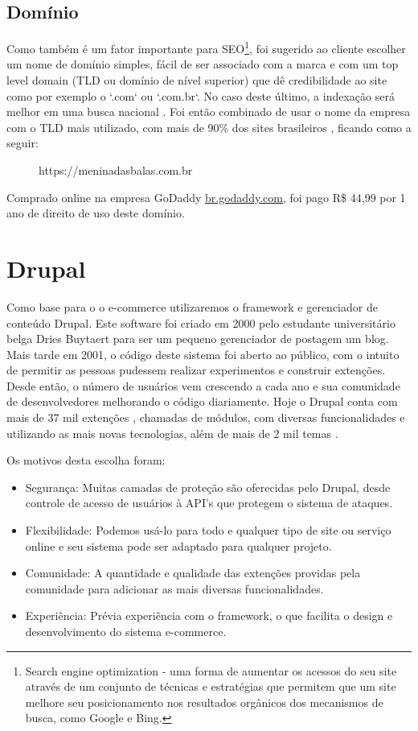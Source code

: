 \subsection{Domínio}
Como também é um fator importante para SEO\footnote{Search engine optimization - uma forma de aumentar os acessos do seu site através de um conjunto de técnicas e estratégias que permitem que um site melhore seu posicionamento nos resultados orgânicos dos mecanismos de busca, como Google e Bing\cite{SEO}.}, foi sugerido ao cliente escolher um nome de domínio simples, fácil de ser associado com a marca e com um top level domain (TLD ou domínio de nível superior) que dê credibilidade ao site como por exemplo o `.com` ou `.com.br`. No caso deste último, a indexação será melhor em uma busca nacional \cite{TLD}. Foi então combinado de usar o nome da empresa com o TLD mais utilizado, com mais de 90\% dos sites brasileiros \cite{RegistroBr}, ficando como a seguir:

\begin{figure}
  \centering
    \large
    https://meninadasbalas.com.br
\end{figure}

Comprado online na empresa GoDaddy \url{br.godaddy.com}, foi pago R\$ 44,99 por 1 ano de direito de uso deste domínio.

\section{Drupal}

Como base para o o e-commerce utilizaremos o framework e gerenciador de conteúdo Drupal. Este software foi criado em 2000 pelo estudante universitário belga Dries Buytaert para ser um pequeno gerenciador de postagem um blog. Mais tarde em 2001, o código deste sistema foi aberto ao público, com o intuito de permitir as pessoas pudessem realizar experimentos e construir extenções. Desde então, o número de usuários vem crescendo a cada ano e sua comunidade de desenvolvedores melhorando o código diariamente. Hoje o Drupal conta com mais de 37 mil extenções \cite{DrupalModules}, chamadas de módulos, com diversas funcionalidades e utilizando as mais novas tecnologias, além de mais de 2 mil temas \cite{DrupalTheme}.

Os motivos desta escolha foram:

\begin{itemize}
  \item Segurança: Muitas camadas de proteção são oferecidas pelo Drupal, desde controle de acesso de usuários à API's que protegem o sistema de ataques.
  \item Flexibilidade: Podemos usá-lo para todo e qualquer tipo de site ou serviço online e seu sistema pode ser adaptado para qualquer projeto.
  \item Comunidade: A quantidade e qualidade das extenções providas pela comunidade para adicionar as mais diversas funcionalidades.
  \item Experiência: Prévia experiência com o framework, o que facilita o design e desenvolvimento do sistema e-commerce.
\end{itemize}

